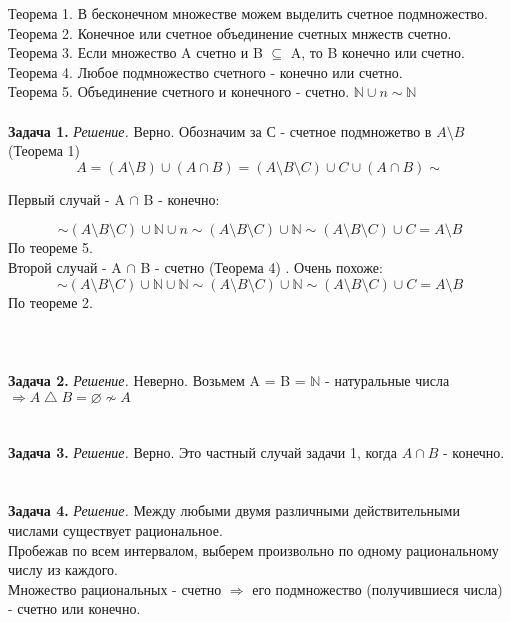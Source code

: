 \documentclass[12pt,a4paper]{scrartcl}
\title{}
\date{Егерев Артем, БПМИ-167}
\author{Домашняя работа по дискретной математике 15}
\begin{document}
\maketitle
\noindent
Теорема 1. В бесконечном множестве можем выделить счетное подмножество.\\
Теорема 2. Конечное или счетное объединение счетных мнжеств счетно.\\
Теорема 3. Если множество A счетно и B  $\subseteq$ A, то B конечно или счетно. \\
Теорема 4. Любое подмножество счетного - конечно или счетно. \\ 
Теорема 5. Объединение счетного и конечного - счетно. $\mathbb N \cup n \sim \mathbb N$
\\ \\
\noindent \textbf{Задача 1.}
\textit{Решение.} Верно.
Обозначим за С - счетное подмножетво в $A\setminus B$ (Теорема 1) \\
$$
A 
= (A \setminus B) \cup (A \cap B)  
=  (A \setminus B \setminus C) \cup C \cup (A \cap B) \sim
$$

\noindent Первый случай - A $\cap$  B - конечно: 

$$
\sim (A \setminus B \setminus C) \cup \mathbb N \cup n
\sim (A \setminus B \setminus C) \cup \mathbb N
\sim (A \setminus B \setminus C) \cup C
= A \setminus B 
$$
По теореме 5. \\

\noindent Второй случай - A $\cap$  B - счетно (Теорема 4) . Очень похоже: 
$$ 
\sim (A \setminus B \setminus C) \cup \mathbb N \cup \mathbb N
\sim (A \setminus B \setminus C) \cup \mathbb N
\sim (A \setminus B \setminus C) \cup C
= A \setminus B
$$
По теореме 2. \\
\\ \\ \\

\noindent \textbf{Задача 2.}
\textit{Решение.} Неверно. Возьмем A = B = $\mathbb N$ - натуральные числа $\Rightarrow A \bigtriangleup B = \varnothing  \nsim A$
\\ \\ \\


\noindent \textbf{Задача 3.}
\textit{Решение.} Верно. Это частный случай задачи 1, когда $A \cap B$ - конечно.
\\ \\ \\


\noindent \textbf{Задача 4.}
\textit{Решение.} 
Между любыми двумя различными действительными числами существует рациональное. \\
Пробежав по всем интервалом, выберем произвольно по одному рациональному числу из каждого. \\
Множество рациональных - счетно $\Rightarrow$ его подмножество (получившиеся числа) - счетно или конечно.
\\ \\ \\
\end{document}
